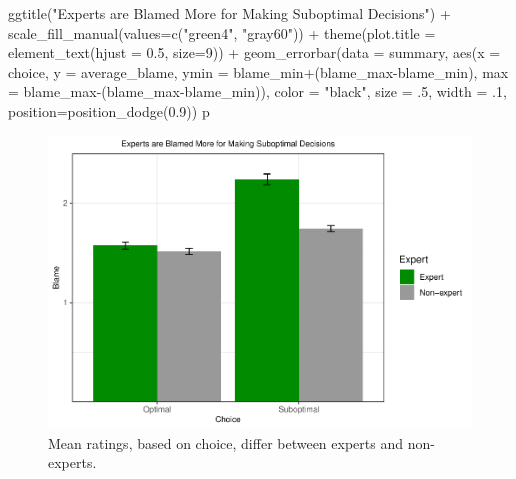 \documentclass[
  man,floatsintext]{apa6}
\newenvironment{Shaded}{\begin{snugshade}}{\end{snugshade}}
\newcommand{\AttributeTok}[1]{\textcolor[rgb]{0.77,0.63,0.00}{#1}}
\newcommand{\DecValTok}[1]{\textcolor[rgb]{0.00,0.00,0.81}{#1}}
\newcommand{\FloatTok}[1]{\textcolor[rgb]{0.00,0.00,0.81}{#1}}
\newcommand{\FunctionTok}[1]{\textcolor[rgb]{0.00,0.00,0.00}{#1}}
\newcommand{\NormalTok}[1]{#1}
\newcommand{\SpecialCharTok}[1]{\textcolor[rgb]{0.00,0.00,0.00}{#1}}
\newcommand{\StringTok}[1]{\textcolor[rgb]{0.31,0.60,0.02}{#1}}
\begin{document}
\begin{Shaded}
\begin{Highlighting}[]
  \FunctionTok{ggtitle}\NormalTok{(}\StringTok{"Experts are Blamed More for Making Suboptimal Decisions"}\NormalTok{) }\SpecialCharTok{+}
  \FunctionTok{scale\_fill\_manual}\NormalTok{(}\AttributeTok{values=}\FunctionTok{c}\NormalTok{(}\StringTok{"green4"}\NormalTok{, }\StringTok{"gray60"}\NormalTok{)) }\SpecialCharTok{+}
  \FunctionTok{theme}\NormalTok{(}\AttributeTok{plot.title =} \FunctionTok{element\_text}\NormalTok{(}\AttributeTok{hjust =} \FloatTok{0.5}\NormalTok{, }\AttributeTok{size=}\DecValTok{9}\NormalTok{)) }\SpecialCharTok{+}
  \FunctionTok{geom\_errorbar}\NormalTok{(}\AttributeTok{data =}\NormalTok{ summary, }\FunctionTok{aes}\NormalTok{(}\AttributeTok{x =}\NormalTok{ choice, }
                                        \AttributeTok{y =}\NormalTok{ average\_blame,}
                                        \AttributeTok{ymin =}\NormalTok{ blame\_min}\SpecialCharTok{+}\NormalTok{(blame\_max}\SpecialCharTok{{-}}\NormalTok{blame\_min), }
                                        \AttributeTok{max =}\NormalTok{ blame\_max}\SpecialCharTok{{-}}\NormalTok{(blame\_max}\SpecialCharTok{{-}}\NormalTok{blame\_min)),}
                \AttributeTok{color =} \StringTok{"black"}\NormalTok{, }\AttributeTok{size =}\NormalTok{ .}\DecValTok{5}\NormalTok{, }\AttributeTok{width =}\NormalTok{ .}\DecValTok{1}\NormalTok{, }\AttributeTok{position=}\FunctionTok{position\_dodge}\NormalTok{(}\FloatTok{0.9}\NormalTok{))}
\NormalTok{p}
\end{Highlighting}
\end{Shaded}

\begin{figure}
\centering
\includegraphics{2-23_in-class_ScientificReportManuscriptDraft4_files/figure-latex/fig-plot-1-1.pdf}
\caption{\label{fig:fig-plot-1}Mean ratings, based on choice, differ between experts and non-experts.}
\end{figure}
\end{document}
